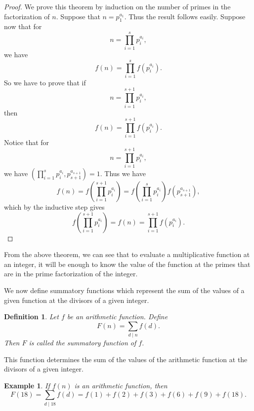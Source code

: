 \documentclass[12pt,letterpaper]{book}
\newtheorem{definition}{Definition}
\newtheorem{example}{Example}
\begin{document}
\begin{proof}
We prove this theorem by induction on the number of primes in the
factorization of $n$.  Suppose that $n=p_1^{a_1}$.  Thus the result
follows easily. Suppose now that for
\begin{equation*}
n=\prod_{i=1}^sp_i^{a_i},
\end{equation*}
we have
\begin{equation*}
f(n)=\prod_{i=1}^sf(p_i^{a_i}).
\end{equation*}
So we have to prove that if
\begin{equation*}
n=\prod_{i=1}^{s+1}p_i^{a_i},
\end{equation*}
then
\begin{equation*}
f(n)=\prod_{i=1}^{s+1}f(p_i^{a_i}).
\end{equation*}
Notice that for
\begin{equation*}
n=\prod_{i=1}^{s+1}p_i^{a_i},
\end{equation*}
we have $(\prod_{i=1}^{s}p_i^{a_i},p_{s+1}^{a_{s+1}})=1$. Thus we
have
\begin{equation*}
f(n)=f\left(\prod_{i=1}^{s+1}p_i^{a_i}\right)=f\left(\prod_{i=1}^{s}p_i^{a_i}\right)f\left(p_{s+1}^{a_{s+1}}\right),
\end{equation*}
which by the inductive step gives
\begin{equation*}
f\left(\prod_{i=1}^{s+1}p_i^{a_i}\right)=f(n)=\prod_{i=1}^{s+1}f(p_i^{a_i}).
\end{equation*}
\end{proof}

From the above theorem, we can see that to evaluate a multiplicative
function at an integer, it will be enough to know the value of the
function at the primes that are in the prime factorization of the
integer.

\par We now define summatory functions which represent the sum of
the values of a given function at the divisors of a given integer.

\begin{definition}
Let $f$ be an arithmetic function.  Define
\begin{equation*}
F(n)=\sum_{d\mid n}f(d).
\end{equation*}
Then $F$ is called the summatory function of $f$. 
\end{definition}
This function determines the sum of the values of the arithmetic
function at the divisors of a given integer.
\begin{example}
If $f(n)$ is an arithmetic function, then
\begin{equation*}
F(18)=\sum_{d\mid 18}f(d)=f(1)+f(2)+f(3)+f(6)+f(9)+f(18).
\end{equation*}
\end{example}
\end{document}
